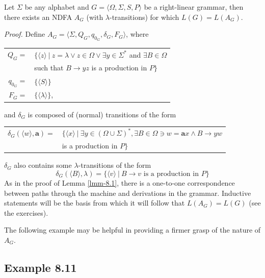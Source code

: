 \begin{lmm}\label{lmm-8.2}
Let $\Sigma$ be any alphabet and $G=\langle\Omega,\Sigma,S,P\rangle$ be a
right-linear grammar, then there exists an NDFA $A_G$ (with $\lambda$-transitions)
for which $L(G)=L(A_G)$.

\emph{Proof.} Define $A_G=\langle\Sigma,Q_G,q_{0_G},\delta_G,F_G\rangle$, where
\begin{center}\begin{tabular}{r@{ }l}
$Q_G =$ & $\{\langle z\rangle\ |\ z=\lambda\vee z\in\Omega\vee\exists y\in
		\Sigma^*$ and $\exists B\in\Omega$ \\
& such that $B\rightarrow yz$ is a production in $P\}$ \\
$q_{0_G} =$ & $\{\langle S\rangle\}$ \\
$F_G =$ & $\{\langle\lambda\rangle\}$,
\end{tabular}\end{center}
and $\delta_G$ is composed of (normal) transitions of the form
\begin{center}\begin{tabular}{r@{ }l}
$\delta_G(\langle w\rangle,\pmb{a}) =$ & $\{\langle x\rangle\ |\ \exists y\in(\Omega
	\cup\Sigma)^*,\exists B\in\Omega\ni w=\pmb{a}x \wedge B\rightarrow yw$ \\
& is a production in $P\}$
\end{tabular}\end{center}
$\delta_G$ also contains some $\lambda$-transitions of the form
\[ \delta_G(\langle B\rangle,\lambda)=\{\langle v\rangle\ |\ B\rightarrow v\text{ is
	a production in }P\} \]
As in the proof of Lemma \ref{lmm-8.1}, there is a one-to-one correspondence between paths
through the machine and derivations in the grammar. Inductive statements will be
the basis from which it will follow that $L(A_G)=L(G)$ (see the exercises).
\end{lmm}

The following example may be helpful in providing a firmer grasp of the
nature of $A_G$.

\subsection*{Example 8.11}

